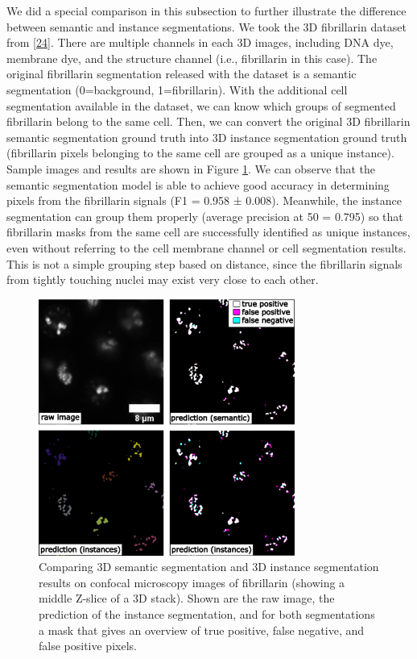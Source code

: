 We did a special comparison in this subsection to further illustrate the difference between semantic and instance segmentations. We took the 3D fibrillarin dataset from {[}\protect\hyperlink{ref-5sGcmDuy}{24}{]}. There are multiple channels in each 3D images, including DNA dye, membrane dye, and the structure channel (i.e., fibrillarin in this case). The original fibrillarin segmentation released with the dataset is a semantic segmentation (0=background, 1=fibrillarin). With the additional cell segmentation available in the dataset, we can know which groups of segmented fibrillarin belong to the same cell. Then, we can convert the original 3D fibrillarin semantic segmentation ground truth into 3D instance segmentation ground truth (fibrillarin pixels belonging to the same cell are grouped as a unique instance). Sample images and results are shown in Figure \ref{fig:3dseg}. We can observe that the semantic segmentation model is able to achieve good accuracy in determining pixels from the fibrillarin signals (F1 = 0.958 ± 0.008). Meanwhile, the instance segmentation can group them properly (average precision at 50 = 0.795) so that fibrillarin masks from the same cell are successfully identified as unique instances, even without referring to the cell membrane channel or cell segmentation results. This is not a simple grouping step based on distance, since the fibrillarin signals from tightly touching nuclei may exist very close to each other.

\begin{figure}
\hypertarget{fig:3dseg}{%
\centering
\includegraphics[width=0.75\textwidth,height=\textheight]{images/semantic_seg3d_justin.png}
\caption{Comparing 3D semantic segmentation and 3D instance segmentation results on confocal microscopy images of fibrillarin (showing a middle Z-slice of a 3D stack). Shown are the raw image, the prediction of the instance segmentation, and for both segmentations a mask that gives an overview of true positive, false negative, and false positive pixels.}\label{fig:3dseg}
}
\end{figure}

